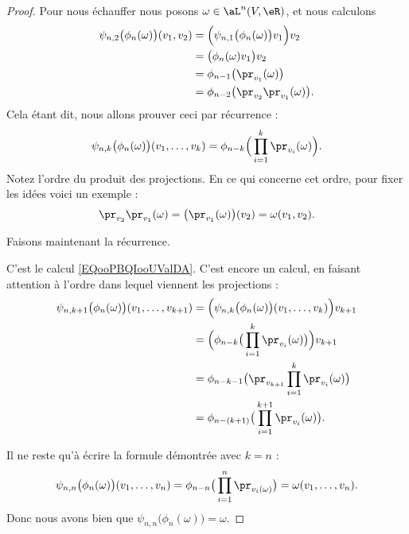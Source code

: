 \begin{proof}
	Pour nous échauffer nous posons \( \omega\in\aL^n(V,\eR)\), et nous calculons
	\begin{subequations}        \label{EQooPBQIooUValDA}
		\begin{align}
			\psi_{n,2}\big( \phi_n(\omega) \big)(v_1,v_2) & =\Big( \psi_{n,1}\big( \phi_n(\omega) \big)v_1 \Big)v_2 \\
			                                              & =\big( \phi_n(\omega)v_1 \big)v_2                       \\
			                                              & =\phi_{n-1}\big( \pr_{v_1}(\omega) \big)                \\
			                                              & =\phi_{n-2}\big( \pr_{v_2}\pr_{v_1}(\omega) \big).
		\end{align}
	\end{subequations}
	Cela étant dit, nous allons prouver ceci par récurrence :
	\begin{equation}
		\psi_{n,k}\big( \phi_n(\omega) \big)(v_1,\ldots, v_k)=\phi_{n-k}\Big( \prod_{i=1}^k\pr_{v_i}(\omega) \Big).
	\end{equation}
	Notez l'ordre du produit des projections. En ce qui concerne cet ordre, pour fixer les idées voici un exemple :
	\begin{equation}
		\pr_{v_2}\pr_{v_1}(\omega)=\big( \pr_{v_1}(\omega) \big)(v_2)=\omega(v_1,v_2).
	\end{equation}

	Faisons maintenant la récurrence.
	\begin{subproof}
		\spitem[Pour \( k=2\)]
		C'est le calcul \eqref{EQooPBQIooUValDA}.
		\spitem[Pour \( k+1\)]
		C'est encore un calcul, en faisant attention à l'ordre dans lequel viennent les projections :
		\begin{subequations}
			\begin{align}
				\psi_{n,k+1}\big( \phi_n(\omega) \big)(v_1,\ldots, v_{k+1}) & =\Big( \psi_{n,k}\big( \phi_n(\omega) \big)(v_1,\ldots, v_k) \Big)v_{k+1} \\
				                                                            & =\Big( \phi_{n-k}\big( \prod_{i=1}^k\pr_{v_i}(\omega) \big) \Big)v_{k+1}  \\
				                                                            & =\phi_{n-k-1}\big( \pr_{v_{k+1}}\prod_{i=1}^k\pr_{v_i}(\omega) \big)      \\
				                                                            & =\phi_{n-(k+1)}\big( \prod_{i=1}^{k+1}\pr_{v_i}(\omega) \big).
			\end{align}
		\end{subequations}
	\end{subproof}
	Il ne reste qu'à écrire la formule démontrée avec \( k=n\) :
	\begin{equation}
		\psi_{n,n}\big( \phi_n(\omega) \big)(v_1,\ldots, v_n)=\phi_{n-n}\big( \prod_{i=1}^n\pr_{v_i(\omega)} \big)=\omega(v_1,\ldots, v_n).
	\end{equation}
	Donc nous avons bien que \( \psi_{n,n}\big( \phi_n(\omega) \big)=\omega\).
\end{proof}

